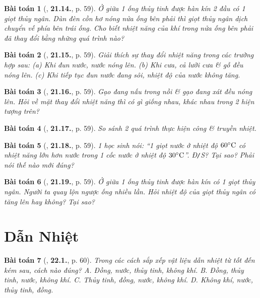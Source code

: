 \documentclass{article}
\numberwithin{equation}{section}
\newtheorem{baitoan}{Bài toán}
\begin{document}
\begin{baitoan}[\cite{SBT_Vat_Ly_8}, \textbf{21.14.}, p. 59]
	Ở giữa 1 ống thủy tinh được hàn kín 2 đầu có 1 giọt thủy ngân. Dùn đèn cồn hơ nóng nửa ống bên phải thì giọt thủy ngân dịch chuyển vế phía bên trái ống. Cho biết nhiệt năng của khí trong nửa ống bên phải đã thay đổi bằng những quá trình nào?
\end{baitoan}

\begin{baitoan}[\cite{SBT_Vat_Ly_8}, \textbf{21.15.}, p. 59]
	Giải thích sự thay đổi nhiệt năng trong các trường hợp sau: (a) Khi đun nước, nước nóng lên. (b) Khi cưa, cả lưỡi cưa \& gỗ đều nóng lên. (c) Khi tiếp tục đun nước đang sôi, nhiệt độ của nước không tăng.
\end{baitoan}

\begin{baitoan}[\cite{SBT_Vat_Ly_8}, \textbf{21.16.}, p. 59]
	Gạo đang nấu trong nồi \& gạo đang xát đều nóng lên. Hỏi về mặt thay đổi nhiệt năng thì có gì giống nhau, khác nhau trong 2 hiện tượng trên?
\end{baitoan}

\begin{baitoan}[\cite{SBT_Vat_Ly_8}, \textbf{21.17.}, p. 59]
	So sánh 2 quá trình thực hiện công \& truyền nhiệt.
\end{baitoan}

\begin{baitoan}[\cite{SBT_Vat_Ly_8}, \textbf{21.18.}, p. 59]
	1 học sinh nói: ``1 giọt nước ở nhiệt độ $60^\circ{\rm C}$ có nhiệt năng lớn hơn nước trong 1 cốc nước ở nhiệt độ $30^\circ{\rm C}$''. \emph{Đ\texttt{/}S?} Tại sao? Phải nói thế nào mới đúng?
\end{baitoan}

\begin{baitoan}[\cite{SBT_Vat_Ly_8}, \textbf{21.19.}, p. 59]
	Ở giữa 1 ống thủy tinh được hàn kín có 1 giọt thủy ngân. Người ta quay lộn ngược ống nhiều lần. Hỏi nhiệt độ của giọt thủy ngân có tăng lên hay không? Tại sao?
\end{baitoan}


\section{Dẫn Nhiệt}

\begin{baitoan}[\cite{SBT_Vat_Ly_8}, \textbf{22.1.}, p. 60]
	Trong các cách sắp xếp vật liệu dẫn nhiệt từ tốt đến kém sau, cách nào đúng? {\sf A.} Đồng, nước, thủy tinh, không khí. {\sf B.} Đồng, thủy tinh, nước, không khí. {\sf C.} Thủy tinh, đồng, nước, không khí. {\sf D.} Không khí, nước, thủy tinh, đồng.
\end{baitoan}
\end{document}

